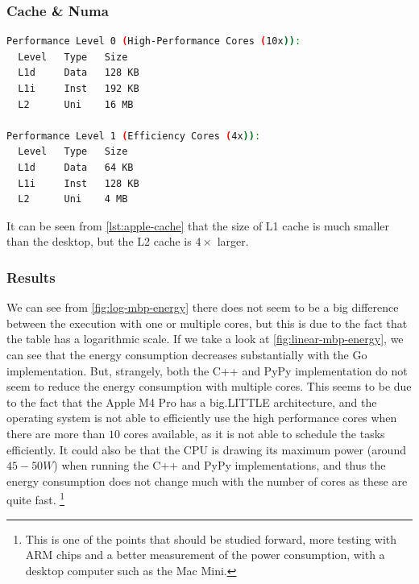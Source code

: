 \subsubsection{Cache \& Numa}

\begin{lstlisting}[language=bash, caption={Cache of the Apple M4 Pro by performance level}, label={lst:apple-cache}]
Performance Level 0 (High-Performance Cores (10x)):
  Level   Type   Size
  L1d     Data   128 KB
  L1i     Inst   192 KB
  L2      Uni    16 MB

Performance Level 1 (Efficiency Cores (4x)):
  Level   Type   Size
  L1d     Data   64 KB
  L1i     Inst   128 KB
  L2      Uni    4 MB
\end{lstlisting}

It can be seen from \autoref{lst:apple-cache} that the size of L1 cache is much smaller than the desktop, but the L2 cache is $4\times$ larger.


\subsubsection{Results}






We can see from \autoref{fig:log-mbp-energy} there does not seem to be a big difference between the execution with one or multiple cores, but this is due to the fact that the table has a logarithmic scale. If we take a look at \autoref{fig:linear-mbp-energy}, we can see that the energy consumption decreases substantially with the Go implementation. But, strangely, both the C++ and PyPy implementation do not seem to reduce the energy consumption with multiple cores. This seems to be due to the fact that the Apple M4 Pro has a big.LITTLE architecture, and the operating system is not able to efficiently use the high performance cores when there are more than $10$ cores available, as it is not able to schedule the tasks efficiently. It could also be that the CPU is drawing its maximum power (around $45-50W$) when running the C++ and PyPy implementations, and thus the energy consumption does not change much with the number of cores as these are quite fast. \footnote{This is one of the points that should be studied forward, more testing with \gls{ARM} chips and a better measurement of the power consumption, with a desktop computer such as the Mac Mini.}

